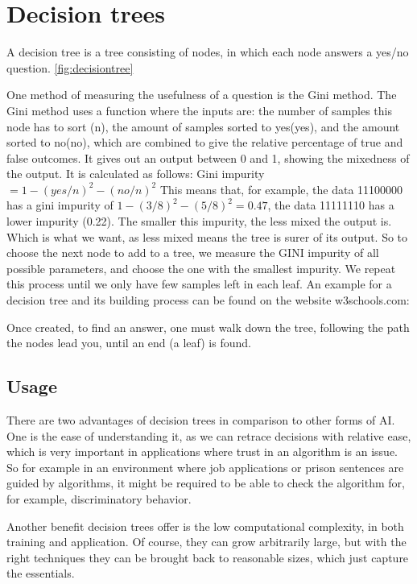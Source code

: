 \section{Decision trees}
\label{sec:decisionTrees}
A decision tree is a tree consisting of nodes, in which each node answers a yes/no question. \autoref{fig:decisiontree}

One method of measuring the usefulness of a question is the Gini method.
The Gini method uses a function where the inputs are: the number of samples this node has to sort (n), the amount of samples sorted to yes(yes), and the amount sorted to no(no), which are combined to give the relative percentage of true and false outcomes. It gives out an output between 0 and 1, showing the mixedness of the output.
It is calculated as follows: Gini impurity $= 1-(yes/n)^2-(no/n)^2$ 
This means that, for example, the data 11100000 has a gini impurity of $1-(3/8)^2-(5/8)^2=0.47$, the data 11111110 has a lower impurity (0.22).
The smaller this impurity, the less mixed the output is. Which is what we want, as less mixed means the tree is surer of its output. 
So to choose the next node to add to a tree, we measure the GINI impurity of all possible parameters, and choose the one with the smallest impurity. We repeat this process until we only have few samples left in each leaf. 
An example for a decision tree and its building process can be found on the website w3schools.com:
\cite{decisiontree}

Once created, to find an answer, one must walk down the tree, following the path the nodes lead you, until an end (a leaf) is found.

\subsection{Usage}
There are two advantages of decision trees in comparison to other forms of AI. One is the ease of understanding it, as we can retrace decisions with relative ease, which is very important in applications where trust in an algorithm is an issue. So for example in an environment where job applications or prison sentences are guided by algorithms, it might be required to be able to check the algorithm for, for example, discriminatory behavior.

Another benefit decision trees offer is the low computational complexity, in both training and application. Of course, they can grow arbitrarily large, but with the right techniques they can be brought back to reasonable sizes, which just capture the essentials.



